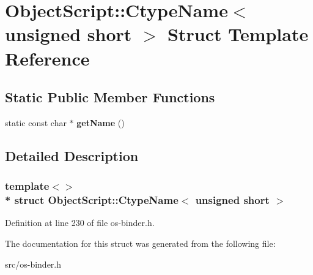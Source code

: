 \hypertarget{struct_object_script_1_1_ctype_name_3_01unsigned_01short_01_4}{}\section{Object\+Script\+:\+:Ctype\+Name$<$ unsigned short $>$ Struct Template Reference}
\label{struct_object_script_1_1_ctype_name_3_01unsigned_01short_01_4}
\subsection*{Static Public Member Functions}
\begin{DoxyCompactItemize}
\item 
static const char $\ast$ {\bfseries get\+Name} ()\hypertarget{struct_object_script_1_1_ctype_name_3_01unsigned_01short_01_4_ac17b06a1de5720379d75f68a78961d02}{}\label{struct_object_script_1_1_ctype_name_3_01unsigned_01short_01_4_ac17b06a1de5720379d75f68a78961d02}

\end{DoxyCompactItemize}


\subsection{Detailed Description}
\subsubsection*{template$<$$>$\\*
struct Object\+Script\+::\+Ctype\+Name$<$ unsigned short $>$}



Definition at line 230 of file os-\/binder.\+h.



The documentation for this struct was generated from the following file\+:\begin{DoxyCompactItemize}
\item 
src/os-\/binder.\+h\end{DoxyCompactItemize}
